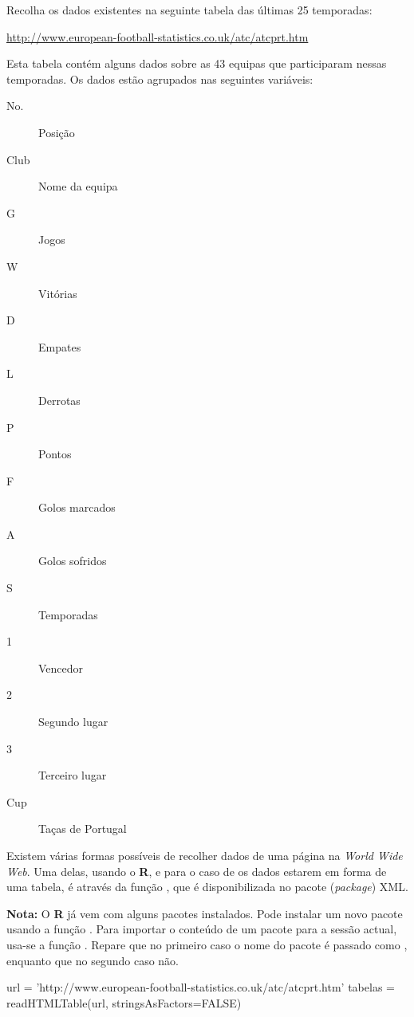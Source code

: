\documentclass{exam}
\begin{document}
 
\begin{questions}
\question  Recolha os dados existentes na seguinte tabela das últimas 25 temporadas:

\begin{center}
	\url{http://www.european-football-statistics.co.uk/atc/atcprt.htm}
\end{center}

Esta tabela contém alguns dados sobre as 43 equipas que participaram nessas temporadas. Os dados estão agrupados nas seguintes variáveis:

\begin{description}
	\item[No.] Posição
	\item[Club] Nome da equipa
	\item[G] Jogos
	\item[W] Vitórias
	\item[D] Empates
	\item[L] Derrotas
	\item[P] Pontos
	\item[F] Golos marcados
	\item[A] Golos sofridos
	\item[S] Temporadas
	\item[1] Vencedor
	\item[2] Segundo lugar
	\item[3] Terceiro lugar
	\item[Cup] Taças de Portugal
\end{description}

Existem várias formas possíveis de recolher dados de uma página na \textit{World Wide Web}. Uma delas, usando o \textbf{R}, e para o caso de os dados estarem em forma de uma tabela, é através da função , que é disponibilizada no pacote (\textit{package}) XML.

\textbf{Nota:} O \textbf{R} já vem com alguns pacotes instalados. Pode instalar um novo pacote usando a função . Para importar o conteúdo de um pacote para a sessão actual, usa-se a função . Repare que no primeiro caso o nome do pacote é passado como , enquanto que no segundo caso não.

\begin{solution}
\begin{rcode}
	url = 'http://www.european-football-statistics.co.uk/atc/atcprt.htm'
	tabelas = readHTMLTable(url, stringsAsFactors=FALSE)
\end{rcode}
\end{solution}


\end{questions}
\end{document}
